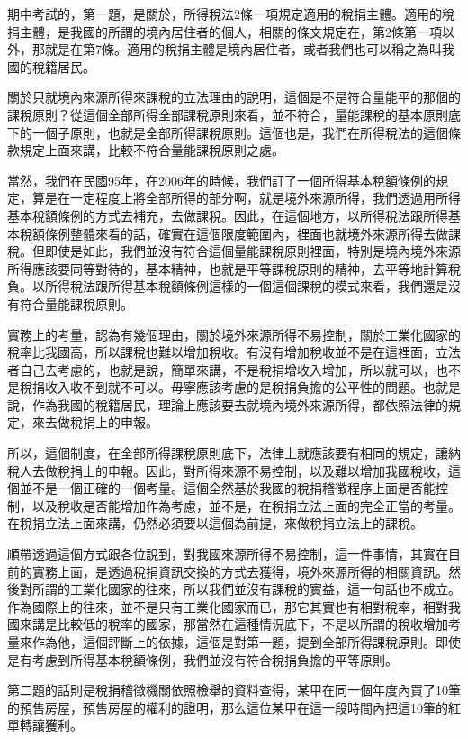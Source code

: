 \documentclass[]{ctexbook}
\begin{document}
期中考試的，第一題，是關於，所得稅法2條一項規定適用的稅捐主體。適用的稅捐主體，是我國的所謂的境內居住者的個人，相關的條文規定在，第2條第一項以外，那就是在第7條。適用的稅捐主體是境內居住者，或者我們也可以稱之為叫我國的稅籍居民。

關於只就境內來源所得來課稅的立法理由的說明，這個是不是符合量能平的那個的課稅原則？從這個全部所得全部課稅原則來看，並不符合，量能課稅的基本原則底下的一個子原則，也就是全部所得課稅原則。這個也是，我們在所得稅法的這個條款規定上面來講，比較不符合量能課稅原則之處。

當然，我們在民國95年，在2006年的時候，我們訂了一個所得基本稅額條例的規定，算是在一定程度上將全部所得的部分啊，就是境外來源所得，我們透過用所得基本稅額條例的方式去補充，去做課稅。因此，在這個地方，以所得稅法跟所得基本稅額條例整體來看的話，確實在這個限度範圍內，裡面也就境外來源所得去做課稅。但即使是如此，我們並沒有符合這個量能課稅原則裡面，特別是境內境外來源所得應該要同等對待的，基本精神，也就是平等課稅原則的精神，去平等地計算稅負。以所得稅法跟所得基本稅額條例這樣的一個這個課稅的模式來看，我們還是沒有符合量能課稅原則。

實務上的考量，認為有幾個理由，關於境外來源所得不易控制，關於工業化國家的稅率比我國高，所以課稅也難以增加稅收。有沒有增加稅收並不是在這裡面，立法者自己去考慮的，也就是說，簡單來講，不是稅捐增收入增加，所以就可以，也不是稅捐收入收不到就不可以。毋寧應該考慮的是稅捐負擔的公平性的問題。也就是說，作為我國的稅籍居民，理論上應該要去就境內境外來源所得，都依照法律的規定，來去做稅捐上的申報。

所以，這個制度，在全部所得課稅原則底下，法律上就應該要有相同的規定，讓納稅人去做稅捐上的申報。因此，對所得來源不易控制，以及難以增加我國稅收，這個並不是一個正確的一個考量。這個全然基於我國的稅捐稽徵程序上面是否能控制，以及稅收是否能增加作為考慮，並不是，在稅捐立法上面的完全正當的考量。在稅捐立法上面來講，仍然必須要以這個為前提，來做稅捐立法上的課稅。

順帶透過這個方式跟各位說到，對我國來源所得不易控制，這一件事情，其實在目前的實務上面，是透過稅捐資訊交換的方式去獲得，境外來源所得的相關資訊。然後對所謂的工業化國家的往來，所以我們並沒有課稅的實益，這一句話也不成立。作為國際上的往來，並不是只有工業化國家而已，那它其實也有相對稅率，相對我國來講是比較低的稅率的國家，那當然在這種情況底下，不是以所謂的稅收增加考量來作為他，這個評斷上的依據，這個是對第一題，提到全部所得課稅原則。即使是有考慮到所得基本稅額條例，我們並沒有符合稅捐負擔的平等原則。

第二題的話則是稅捐稽徵機關依照檢舉的資料查得，某甲在同一個年度內買了10筆的預售房屋，預售房屋的權利的證明，那么這位某甲在這一段時間內把這10筆的紅單轉讓獲利。
\end{document}
